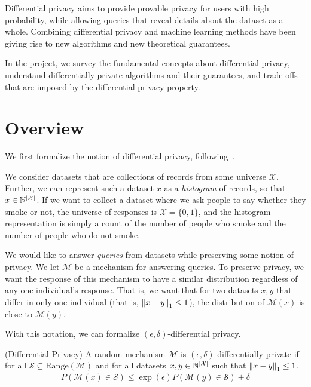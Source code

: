 \documentclass{article} %
\begin{document}
Differential privacy aims to provide provable privacy for users with high probability, while allowing queries that reveal details about the dataset as a whole. Combining differential privacy and machine learning methods have been giving rise to new algorithms and new theoretical guarantees.

In the project, we survey the fundamental concepts about differential privacy, understand differentially-private algorithms and their guarantees, and trade-offs that are imposed by the differential privacy property.


\section{Overview}\label{overview}
We first formalize the notion of differential privacy, following~\cite{dwork2014algorithmic}.

We consider datasets that are collections of records from some
universe $\mathcal{X}$. Further, we can represent such a dataset $x$ as a
\textit{histogram} of records, so that $x \in \mathbb{N}^{\left\lvert\mathcal{X}\right\rvert}$. If we want
to collect a dataset where we ask people to say whether they smoke or not, the
universe of responses is $\mathcal{X} = \{0, 1\}$, and the histogram
representation is simply a count of the number of people who smoke and the
number of people who do not smoke.

We would like to answer \textit{queries} from datasets while preserving some
notion of privacy. We let $\mathcal{M}$ be a mechanism for answering
queries. To preserve privacy, we want the response of this mechanism
to have a similar distribution regardless of any one individual's response.
That is, we want that for two datasets $x, y$ that differ in only one
individual (that is, $\left\lVert x - y\right\rVert_1 \leq 1$), the distribution of
$\mathcal{M}(x)$ is close to $\mathcal{M}(y)$.

With this notation, we can formalize $(\epsilon, \delta)$-differential privacy.

\theoremstyle{definition}
\begin{definition}{(Differential Privacy)}
A random mechanism $\mathcal{M}$ is $(\epsilon, \delta)$-differentially private
if for all $\mathcal{S} \subseteq \textrm{Range}(\mathcal{M})$ and for all
datasets $x, y \in \mathbb{N}^{\left\lvert\mathcal{X}\right\rvert}$
such that $\left\lVert x - y\right\rVert_1 \leq 1$,
\begin{align*}
P(\mathcal{M}(x) \in \mathcal{S}) \leq \exp{(\epsilon)} P(\mathcal{M}(y) \in \mathcal{S}) + \delta
\end{align*}
\end{definition}
\end{document}
